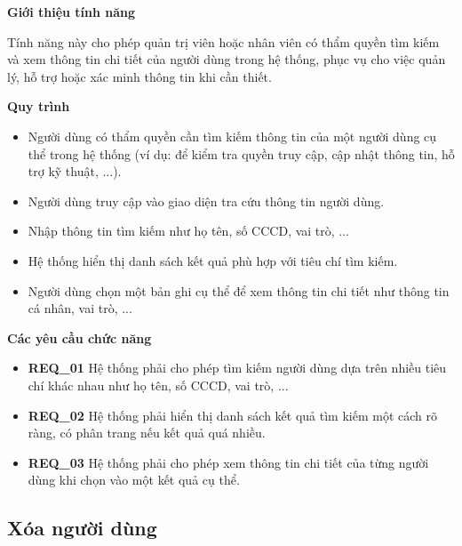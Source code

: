 \noindent \textbf{Giới thiệu tính năng}

Tính năng này cho phép quản trị viên hoặc nhân viên có thẩm quyền tìm kiếm và xem thông tin chi tiết của người dùng trong hệ thống, phục vụ cho việc quản lý, hỗ trợ hoặc xác minh thông tin khi cần thiết.

\noindent \textbf{Quy trình}

\begin{itemize}

  \item Người dùng có thẩm quyền cần tìm kiếm thông tin của một người dùng cụ thể trong hệ thống (ví dụ: để kiểm tra quyền truy cập, cập nhật thông tin, hỗ trợ kỹ thuật, ...).

  \item Người dùng truy cập vào giao diện tra cứu thông tin người dùng.

  \item Nhập thông tin tìm kiếm như họ tên, số CCCD, vai trò, ...

  \item Hệ thống hiển thị danh sách kết quả phù hợp với tiêu chí tìm kiếm.

  \item Người dùng chọn một bản ghi cụ thể để xem thông tin chi tiết như thông tin cá nhân, vai trò, ...

\end{itemize}

\noindent \textbf{Các yêu cầu chức năng}

\begin{itemize}

  \item \textbf{REQ\_01} Hệ thống phải cho phép tìm kiếm người dùng dựa trên nhiều tiêu chí khác nhau như họ tên, số CCCD, vai trò, ...

  \item \textbf{REQ\_02} Hệ thống phải hiển thị danh sách kết quả tìm kiếm một cách rõ ràng, có phân trang nếu kết quả quá nhiều.

  \item \textbf{REQ\_03} Hệ thống phải cho phép xem thông tin chi tiết của từng người dùng khi chọn vào một kết quả cụ thể.

\end{itemize}

\subsection{Xóa người dùng}

